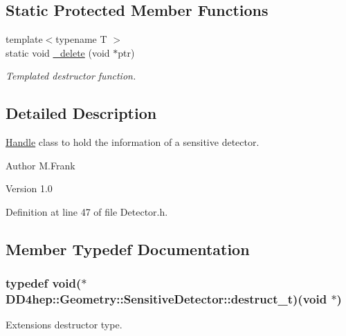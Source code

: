 \subsection*{Static Protected Member Functions}
\begin{DoxyCompactItemize}
\item 
{\footnotesize template$<$typename T $>$ }\\static void \hyperlink{class_d_d4hep_1_1_geometry_1_1_sensitive_detector_a126acbacbe8c3e1c0214585ec498e042}{\_\-delete} (void $\ast$ptr)
\begin{DoxyCompactList}\small\item\em Templated destructor function. \item\end{DoxyCompactList}\end{DoxyCompactItemize}


\subsection{Detailed Description}
\hyperlink{class_d_d4hep_1_1_handle}{Handle} class to hold the information of a sensitive detector. \begin{DoxyAuthor}{Author}
M.Frank 
\end{DoxyAuthor}
\begin{DoxyVersion}{Version}
1.0 
\end{DoxyVersion}


Definition at line 47 of file Detector.h.

\subsection{Member Typedef Documentation}
\hypertarget{class_d_d4hep_1_1_geometry_1_1_sensitive_detector_a5da3147260d9ed63a0e840e9c1ab43f3}{
\subsubsection[{destruct\_\-t}]{\setlength{\rightskip}{0pt plus 5cm}typedef void($\ast$ {\bf DD4hep::Geometry::SensitiveDetector::destruct\_\-t})(void $\ast$)}}
\label{class_d_d4hep_1_1_geometry_1_1_sensitive_detector_a5da3147260d9ed63a0e840e9c1ab43f3}


Extensions destructor type. 

